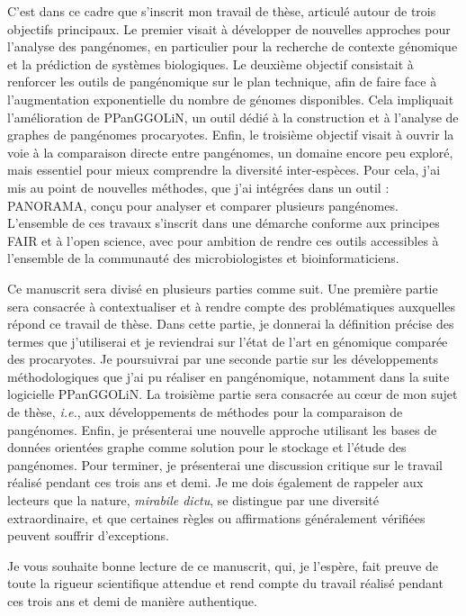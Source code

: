 \newpage

C’est dans ce cadre que s’inscrit mon travail de thèse, articulé autour de trois objectifs principaux. Le premier visait à développer de nouvelles approches pour l’analyse des pangénomes, en particulier pour la recherche de contexte génomique et la prédiction de systèmes biologiques. Le deuxième objectif consistait à renforcer les outils de pangénomique sur le plan technique, afin de faire face à l’augmentation exponentielle du nombre de génomes disponibles. Cela impliquait l’amélioration de PPanGGOLiN, un outil dédié à la construction et à l’analyse de graphes de pangénomes procaryotes. Enfin, le troisième objectif visait à ouvrir la voie à la comparaison directe entre pangénomes, un domaine encore peu exploré, mais essentiel pour mieux comprendre la diversité inter-espèces. Pour cela, j’ai mis au point de nouvelles méthodes, que j’ai intégrées dans un outil : PANORAMA, conçu pour analyser et comparer plusieurs pangénomes. L’ensemble de ces travaux s’inscrit dans une démarche conforme aux principes FAIR et à l’open science, avec pour ambition de rendre ces outils accessibles à l’ensemble de la communauté des microbiologistes et bioinformaticiens.

Ce manuscrit sera divisé en plusieurs parties comme suit. Une première partie sera consacrée à contextualiser et à rendre compte des problématiques auxquelles répond ce travail de thèse. Dans cette partie, je donnerai la définition précise des termes que j'utiliserai et je reviendrai sur l'état de l'art en génomique comparée des procaryotes. Je poursuivrai par une seconde partie sur les développements méthodologiques que j'ai pu réaliser en pangénomique, notamment dans la suite logicielle PPanGGOLiN. La troisième partie sera consacrée au c\oe ur de mon sujet de thèse, \textit{i.e.}, aux développements de méthodes pour la comparaison de pangénomes. Enfin, je présenterai une nouvelle approche utilisant les bases de données orientées graphe comme solution pour le stockage et l'étude des pangénomes. Pour terminer, je présenterai une discussion critique sur le travail réalisé pendant ces trois ans et demi. Je me dois également de rappeler aux lecteurs que la nature, \textit{mirabile dictu}, se distingue par une diversité extraordinaire, et que certaines règles ou affirmations généralement vérifiées peuvent souffrir d'exceptions.

\bigskip

Je vous souhaite bonne lecture de ce manuscrit, qui, je l'espère, fait preuve de toute la rigueur scientifique attendue et rend compte du travail réalisé pendant ces trois ans et demi de manière authentique.
